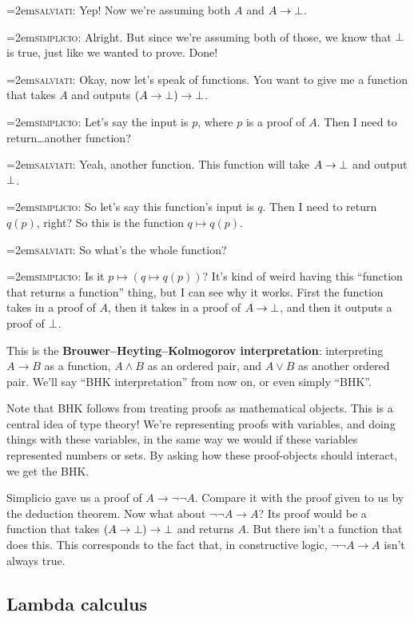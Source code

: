 \documentclass[11pt,paper=letter]{scrartcl}
\renewcommand{\land}{\wedge}
\renewcommand{\lor}{\vee}
\renewcommand{\lnot}{\neg}
\newcommand{\simp}{\vspace{0.5em}\noindent\hangindent=2em\textsc{simplicio:} }
\newcommand{\salv}{\vspace{0.5em}\noindent\hangindent=2em\textsc{salviati:} }
\begin{document}
\salv Yep! Now we're assuming both $A$ and $A \to \bot$.

\simp Alright. But since we're assuming both of those, we know that $\bot$ is true, just like we wanted to prove. Done!

\salv Okay, now let's speak of functions. You want to give me a function that takes $A$ and outputs $(A \to \bot) \to \bot$.

\simp Let's say the input is $p$, where $p$ is a proof of $A$. Then I need to return\dots another function?

\salv Yeah, another function. This function will take $A \to \bot$ and output $\bot$.

\simp So let's say this function's input is $q$. Then I need to return $q(p)$, right? So this is the function $q \mapsto q(p)$.

\salv So what's the whole function?

\simp Is it $p \mapsto (q \mapsto q(p))$? It's kind of weird having this ``function that returns a function'' thing, but I can see why it works. First the function takes in a proof of $A$, then it takes in a proof of $A \to \bot$, and then it outputs a proof of $\bot$.

\vspace{0.5em}

This is the \textbf{Brouwer--Heyting--Kolmogorov interpretation}: interpreting $A \to B$ as a function, $A \land B$ as an ordered pair, and $A \lor B$ as another ordered pair. We'll say ``BHK interpretation'' from now on, or even simply ``BHK''.

Note that BHK follows from treating proofs as mathematical objects. This is a central idea of type theory! We're representing proofs with variables, and doing things with these variables, in the same way we would if these variables represented numbers or sets. By asking how these proof-objects should interact, we get the BHK.

Simplicio gave us a proof of $A \to \lnot\lnot A$. Compare it with the proof given to us by the deduction theorem. Now what about $\lnot\lnot A \to A$? Its proof would be a function that takes $(A \to \bot) \to \bot$ and returns $A$. But there isn't a function that does this. This corresponds to the fact that, in constructive logic, $\lnot\lnot A \to A$ isn't always true.

\subsection{Lambda calculus}
\end{document}
